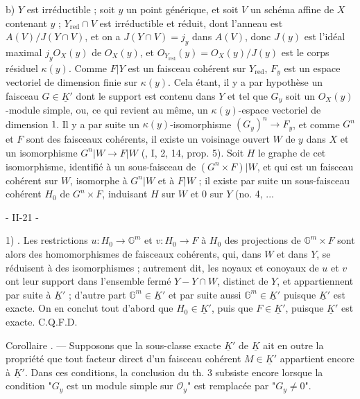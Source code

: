 b) $Y$ est irréductible ; soit $y$ un point générique, et soit $V$ un schéma affine de $X$ contenant $y$ ; $Y_{\text{red}} \cap V$ est irréductible et réduit, dont l'anneau est $A(V)/J(Y \cap V)$, et on a $J(Y \cap V) = j_y$ dans $A(V)$, donc $J(y)$ est l'idéal maximal $j_y O_X(y)$ de $O_X(y)$, et $O_{Y_{\text{red}}}(y) = O_X(y)/J(y)$ est le corps résiduel $\kappa(y)$. Comme $F|Y$ est un faisceau cohérent sur $Y_{\text{red}}$, $F_y$ est un espace vectoriel de dimension finie sur $\kappa(y)$. Cela étant, il y a par hypothèse un faisceau $G \in \underline{K}'$ dont le support est contenu dans $Y$ et tel que $G_y$ soit un $O_X(y)$-module simple, ou, ce qui revient au même, un $\kappa(y)$-espace vectoriel de dimension $1$. Il y a par suite un $\kappa(y)$-isomorphisme $(G_y)^n \to F_y$, et comme $G^n$ et $F$ sont des faisceaux cohérents, il existe un voisinage ouvert $W$ de $y$ dans $X$ et un isomorphisme $G^n|W \to F|W$ (, I, 2, 14, prop. 5). Soit $H$ le graphe de cet isomorphisme, identifié à un sous-faisceau de $(G^n \times F)|W$, et qui est un faisceau cohérent sur $W$, isomorphe à $G^n|W$ et à $F|W$ ; il existe par suite un sous-faisceau cohérent $H_0$ de $G^n \times F$, induisant $H$ sur $W$ et $0$ sur $Y$ (no. 4, ...

\newpage


- II-21 -

1) . Les restrictions $u: H_0 \to \mathbb{G}^m$ et $v: H_0 \to F$ à $H_0$ des projections de $\mathbb{G}^m \times F$ sont alors des homomorphismes de faisceaux cohérents, qui, dans $W$ et dans $Y$, se réduisent à des isomorphismes ; autrement dit, les noyaux et conoyaux de $u$ et $v$ ont leur support dans l'ensemble fermé $Y - Y \cap W$, distinct de $Y$, et appartiennent par suite à $\underline{K}'$ ; d'autre part $\mathbb{G}^m \in \underline{K}'$ et par suite aussi $\mathbb{G}^m \in \underline{K}'$ puisque $\underline{K}'$ est exacte. On en conclut tout d'abord que $H_0 \in \underline{K}'$, puis que $F \in \underline{K}'$, puisque $\underline{K}'$ est exacte. C.Q.F.D.

Corollaire . — Supposons que la sous-classe exacte $\underline{K}'$ de $\underline{K}$ ait en outre la propriété que tout facteur direct d'un faisceau cohérent $M \in \underline{K}'$ appartient encore à $\underline{K}'$. Dans ces conditions, la conclusion du th. 3 subsiste encore lorsque la condition "$G_y$ est un module simple sur $\mathcal{O}_y$" est remplacée par "$G_y \neq 0$".

